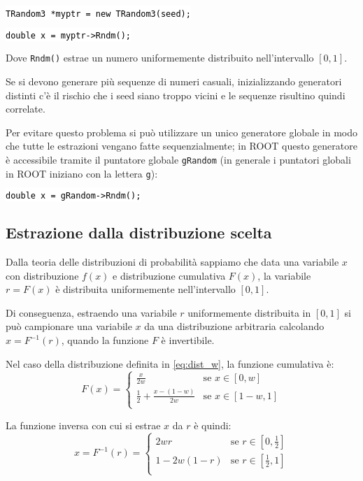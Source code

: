 \documentclass[10pt]{article}
\newcommand{\ttt}{\texttt}
\newcommand{\tcpp}[1]{\hspace{10pt}\colorbox{background}{\textcolor{black}{\texttt{#1}}}}
\begin{document}
\vspace{10pt}

\tcpp{TRandom3 *myptr = new TRandom3(seed);}

\tcpp{double x = myptr->Rndm();}

\vspace{10pt}

Dove \ttt{Rndm()} estrae un numero uniformemente distribuito nell'intervallo \([0,1]\).

Se si devono generare più sequenze di numeri casuali, inizializzando generatori distinti c'è il rischio che i seed siano troppo vicini e le sequenze risultino quindi correlate.

Per evitare questo problema si può utilizzare un unico generatore globale in modo che tutte le estrazioni vengano fatte sequenzialmente;
in ROOT questo generatore è accessibile tramite il puntatore globale \ttt{gRandom} (in generale i puntatori globali in ROOT iniziano con la lettera \ttt{g}):

\vspace{10pt}

\tcpp{double x = gRandom->Rndm();}

\subsection{Estrazione dalla distribuzione scelta}

Dalla teoria delle distribuzioni di probabilità sappiamo che data una variabile \(x\) con distribuzione \(f(x)\) e distribuzione cumulativa \(F(x)\), la variabile \(r=F(x)\) è distribuita uniformemente nell'intervallo \([0,1]\).

Di conseguenza, estraendo una variabile \(r\) uniformemente distribuita in \([0,1]\) si può campionare una variabile \(x\) da una distribuzione arbitraria calcolando \(x=F^{-1}(r)\), quando la funzione \(F\) è invertibile.

Nel caso della distribuzione definita in \eqref{eq:dist_w}, la funzione cumulativa è:
\begin{equation*}
F(x) = \begin{cases}
    \frac{x}{2w} & \text{se } x \in [0,w] \\
    \frac{1}{2} + \frac{x - (1 - w)}{2w} & \text{se } x \in [1-w,1] \\
\end{cases}
\end{equation*}

La funzione inversa con cui si estrae \(x\) da \(r\) è quindi:
\begin{equation*}
x = F^{-1}(r) =
\begin{cases}
    2wr & \text{se } r \in [0, \tfrac{1}{2}] \\
    1 - 2w(1 - r) & \text{se } r \in [\tfrac{1}{2}, 1] \\
\end{cases}
\end{equation*}
\end{document}
